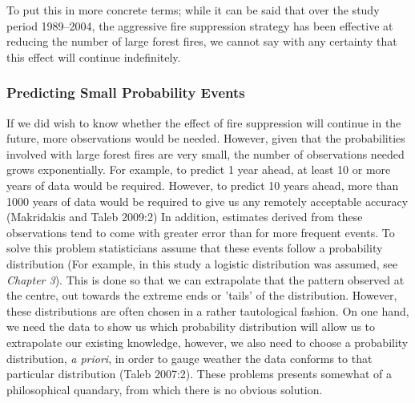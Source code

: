 \begin{spacing}{1.5}
\noindent To put this in more concrete terms; while it can be said that over the study period 1989--2004, the aggressive fire suppression strategy has been effective at reducing the number of large forest fires, we cannot say with any certainty that this effect will continue indefinitely.

\subsubsection{Predicting Small Probability Events}
If we did wish to know whether the effect of fire suppression will continue in the future, more observations would be needed. However, given that the probabilities involved with large forest fires are very small, the number of observations needed grows exponentially. For example, to predict 1 year ahead, at least 10 or more years of data would be required. However, to predict 10 years ahead, more than 1000 years of data would be required to give us any remotely acceptable accuracy (Makridakis and Taleb 2009:2) In addition, estimates derived from these observations tend to come with greater error than for more frequent events. To solve this problem statisticians assume that these events follow a probability distribution (For example, in this study a logistic distribution was assumed, see \emph{Chapter 3}). This is done so that we can extrapolate that the pattern observed at the centre, out towards the extreme ends or 'tails' of the distribution. However, these distributions are often chosen in a rather tautological fashion. On one hand, we need the data to show us which probability distribution will allow us to extrapolate our existing knowledge, however, we also need to choose a probability distribution, \emph{a priori}, in order to gauge weather the data conforms to that particular distribution (Taleb 2007:2). These problems  presents somewhat of a philosophical quandary, from which there is no obvious solution.

\end{spacing}
\clearpage
